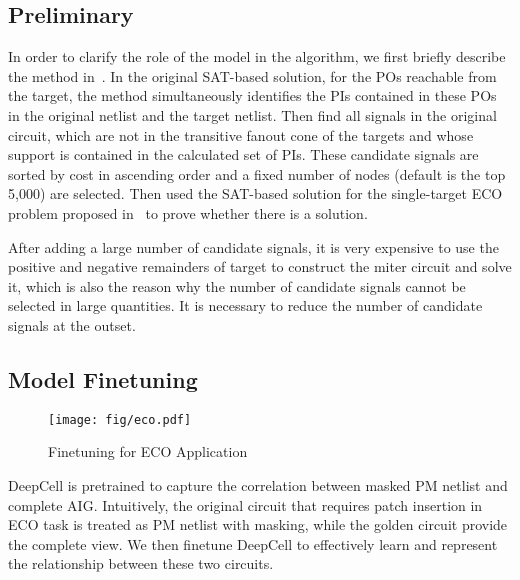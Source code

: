 \subsection{Preliminary}
In order to clarify the role of the model in the algorithm, we first briefly describe the method in~\cite{dao2018efficient}. In the original SAT-based solution, for the POs reachable from the target, the method simultaneously identifies the PIs contained in these POs in the original netlist and the target netlist. Then find all signals in the original circuit, which are not in 
the transitive fanout cone of the targets and whose support is contained in the calculated set of PIs. These candidate signals are sorted by cost in ascending order and a fixed number of nodes (default is the top 5,000) are selected. Then used the SAT-based solution for the single-target ECO problem proposed in~\cite{wu2010robust} to prove whether there is a solution.


After adding a large number of candidate signals, it is very expensive to use the positive and negative remainders of target to construct the miter circuit and solve it, which is also the reason why the number of candidate signals cannot be selected in large quantities. It is necessary to reduce the number of candidate signals at the outset.

\vspace{-5pt}
\subsection{Model Finetuning}
\begin{figure}
    \centering
    \texttt{[image: fig/eco.pdf]}
    \vspace{-5pt}
    \caption{Finetuning for ECO Application}
    \label{fig:eco}
  \vspace{-15pt}
\end{figure}


DeepCell is pretrained to capture the correlation between masked PM netlist and complete AIG. Intuitively, the original circuit that requires patch insertion in ECO task is treated as PM netlist with masking, while the golden circuit provide the complete view. We then finetune DeepCell to effectively learn and represent the relationship between these two circuits. 

